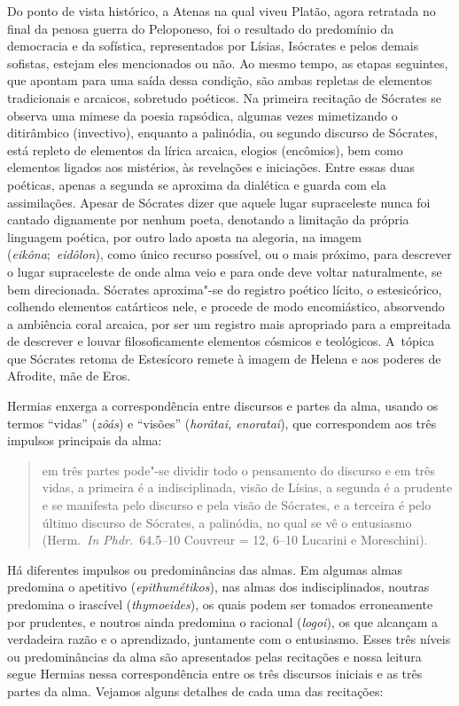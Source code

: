 Do ponto de vista histórico, a Atenas na qual viveu Platão, agora
retratada no final da penosa guerra do Peloponeso, foi o resultado do
predomínio da democracia e da sofística, representados por Lísias,
Isócrates e pelos demais sofistas, estejam eles mencionados ou não. Ao
mesmo tempo, as etapas seguintes, que apontam para uma saída dessa
condição, são ambas repletas de elementos tradicionais e arcaicos,
sobretudo poéticos. Na primeira recitação de Sócrates se observa uma
mimese da poesia rapsódica, algumas vezes mimetizando o ditirâmbico
(invectivo), enquanto a palinódia, ou segundo discurso de Sócrates, está
repleto de elementos da lírica arcaica, elogios (encômios), bem como
elementos ligados aos mistérios, às revelações e iniciações. Entre essas
duas poéticas, apenas a segunda se aproxima da dialética e guarda com
ela assimilações. Apesar de Sócrates dizer que aquele lugar supraceleste
nunca foi cantado dignamente por nenhum poeta, denotando a limitação da
própria linguagem poética, por outro lado aposta na alegoria, na imagem
(\emph{eikôna};~\emph{eidôlon}), como único recurso possível, ou o mais
próximo, para descrever o lugar supraceleste de onde alma veio e para
onde deve voltar naturalmente, se bem direcionada. Sócrates aproxima"-se
do registro poético lícito, o estesicórico, colhendo elementos
catárticos nele, e procede de modo encomiástico, absorvendo a ambiência
coral arcaica, por ser um registro mais apropriado para a empreitada de
descrever e louvar filosoficamente elementos cósmicos e teológicos. A~tópica que Sócrates retoma de Estesícoro remete à imagem de Helena e aos
poderes de Afrodite, mãe de Eros.

Hermias enxerga a correspondência entre discursos e partes da alma,
usando os termos ``vidas'' (\emph{zôás}) e ``visões'' (\emph{horâtai,
enoratai}), que correspondem aos três impulsos principais da alma:

 

\begin{quote}
em três partes pode"-se dividir todo o pensamento do discurso e em três
vidas, a primeira é a indisciplinada, visão de Lísias, a segunda é a
prudente e se manifesta pelo discurso e pela visão de Sócrates, e a
terceira é pelo último discurso de Sócrates, a palinódia, no qual se vê
o entusiasmo (Herm.~\emph{In Phdr.}~64.5--10 Couvreur = 12, 6--10
Lucarini e Moreschini).
\end{quote}

 

Há diferentes impulsos ou predominâncias das almas. Em algumas almas
predomina o apetitivo (\emph{epithumétikos}), nas almas dos
indisciplinados, noutras predomina o irascível (\emph{thymoeides}), os
quais podem ser tomados erroneamente por prudentes, e noutros ainda
predomina o racional (\emph{logoi}), os que alcançam a verdadeira razão
e o aprendizado, juntamente com o entusiasmo. Esses três níveis ou
predominâncias da alma são apresentados pelas recitações e nossa leitura
segue Hermias nessa correspondência entre os três discursos iniciais e
as três partes da alma. Vejamos alguns detalhes de cada uma das
recitações:

